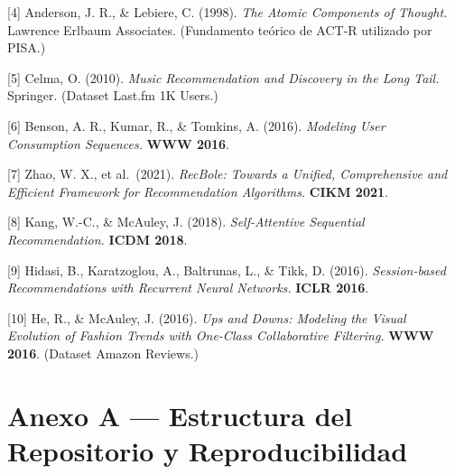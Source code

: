 \documentclass{article}
\begin{document}
{[}4{]} Anderson, J. R., \& Lebiere, C. (1998). \emph{The Atomic Components of Thought.} Lawrence Erlbaum Associates. (Fundamento teórico de ACT-R utilizado por PISA.)

{[}5{]} Celma, O. (2010). \emph{Music Recommendation and Discovery in the Long Tail.} Springer. (Dataset Last.fm 1K Users.)

{[}6{]} Benson, A. R., Kumar, R., \& Tomkins, A. (2016). \emph{Modeling User Consumption Sequences.} \textbf{WWW 2016}.

{[}7{]} Zhao, W. X., et al.~(2021). \emph{RecBole: Towards a Unified, Comprehensive and Efficient Framework for Recommendation Algorithms.} \textbf{CIKM 2021}.

{[}8{]} Kang, W.-C., \& McAuley, J. (2018). \emph{Self-Attentive Sequential Recommendation.} \textbf{ICDM 2018}.

{[}9{]} Hidasi, B., Karatzoglou, A., Baltrunas, L., \& Tikk, D. (2016). \emph{Session-based Recommendations with Recurrent Neural Networks.} \textbf{ICLR 2016}.

{[}10{]} He, R., \& McAuley, J. (2016). \emph{Ups and Downs: Modeling the Visual Evolution of Fashion Trends with One-Class Collaborative Filtering.} \textbf{WWW 2016}. (Dataset Amazon Reviews.)

\section*{Anexo A --- Estructura del Repositorio y Reproducibilidad}\label{anexo-a-estructura-del-repositorio-y-reproducibilidad}
\end{document}
